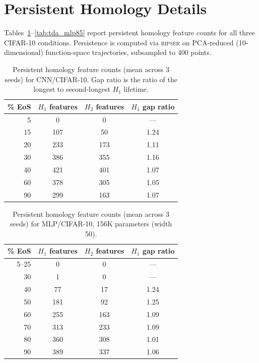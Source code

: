 \documentclass[aps,prl,twocolumn,superscriptaddress,floatfix]{revtex4-2}
\begin{document}
\section{Persistent Homology Details}

Tables~\ref{tab:tda}--\ref{tab:tda_mlp85} report persistent homology feature counts for all three CIFAR-10 conditions. Persistence is computed via \textsc{ripser} on PCA-reduced (10-dimensional) function-space trajectories, subsampled to 400 points.

\begin{table}[h]
\caption{\label{tab:tda}%
Persistent homology feature counts (mean across 3 seeds) for CNN/CIFAR-10. Gap ratio is the ratio of the longest to second-longest $H_1$ lifetime.}
\begin{ruledtabular}
\begin{tabular}{rccc}
\% EoS & $H_1$ features & $H_2$ features & $H_1$ gap ratio\\
\hline
5 & 0 & 0 & ---\\
15 & 107 & 50 & 1.24\\
20 & 233 & 173 & 1.11\\
30 & 386 & 355 & 1.16\\
40 & 421 & 401 & 1.07\\
60 & 378 & 305 & 1.05\\
90 & 299 & 163 & 1.07\\
\end{tabular}
\end{ruledtabular}
\end{table}

\begin{table}[h]
\caption{\label{tab:tda_mlp50}%
Persistent homology feature counts (mean across 3 seeds) for MLP/CIFAR-10, 156K parameters (width 50).}
\begin{ruledtabular}
\begin{tabular}{rccc}
\% EoS & $H_1$ features & $H_2$ features & $H_1$ gap ratio\\
\hline
5--25 & 0 & 0 & ---\\
30 & 1 & 0 & ---\\
40 & 77 & 17 & 1.24\\
50 & 181 & 92 & 1.25\\
60 & 255 & 163 & 1.09\\
70 & 313 & 233 & 1.09\\
80 & 360 & 308 & 1.01\\
90 & 389 & 337 & 1.06\\
\end{tabular}
\end{ruledtabular}
\end{table}
\end{document}
